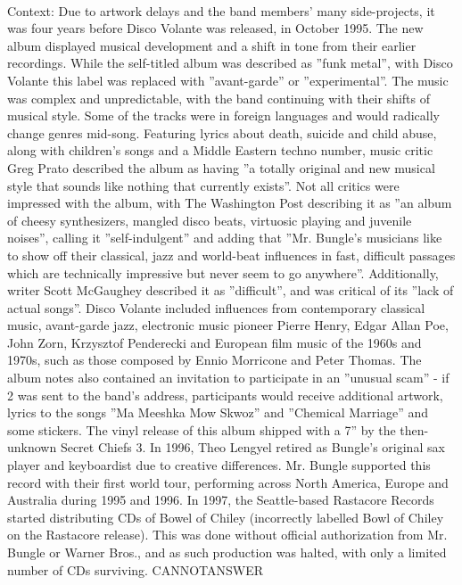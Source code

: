 \documentclass[11pt,a4paper, onecolumn]{article}
\begin{document}
\\ Context: Due to artwork delays and the band members' many side-projects, it was four years before Disco Volante was released, in October 1995. The new album displayed musical development and a shift in tone from their earlier recordings. While the self-titled album was described as ''funk metal'', with Disco Volante this label was replaced with ''avant-garde'' or ''experimental''. The music was complex and unpredictable, with the band continuing with their shifts of musical style. Some of the tracks were in foreign languages and would radically change genres mid-song. Featuring lyrics about death, suicide and child abuse, along with children's songs and a Middle Eastern techno number, music critic Greg Prato described the album as having ''a totally original and new musical style that sounds like nothing that currently exists''. Not all critics were impressed with the album, with The Washington Post describing it as ''an album of cheesy synthesizers, mangled disco beats, virtuosic playing and juvenile noises'', calling it ''self-indulgent'' and adding that ''Mr. Bungle's musicians like to show off their classical, jazz and world-beat influences in fast, difficult passages which are technically impressive but never seem to go anywhere''. Additionally, writer Scott McGaughey described it as ''difficult'', and was critical of its ''lack of actual songs''. Disco Volante included influences from contemporary classical music, avant-garde jazz, electronic music pioneer Pierre Henry, Edgar Allan Poe, John Zorn, Krzysztof Penderecki and European film music of the 1960s and 1970s, such as those composed by Ennio Morricone and Peter Thomas. The album notes also contained an invitation to participate in an ''unusual scam'' - if  2 was sent to the band's address, participants would receive additional artwork, lyrics to the songs ''Ma Meeshka Mow Skwoz'' and ''Chemical Marriage'' and some stickers. The vinyl release of this album shipped with a 7'' by the then-unknown Secret Chiefs 3. In 1996, Theo Lengyel retired as Bungle's original sax player and keyboardist due to creative differences. Mr. Bungle supported this record with their first world tour, performing across North America, Europe and Australia during 1995 and 1996. In 1997, the Seattle-based Rastacore Records started distributing CDs of Bowel of Chiley (incorrectly labelled Bowl of Chiley on the Rastacore release). This was done without official authorization from Mr. Bungle or Warner Bros., and as such production was halted, with only a limited number of CDs surviving. CANNOTANSWER
\end{document}
